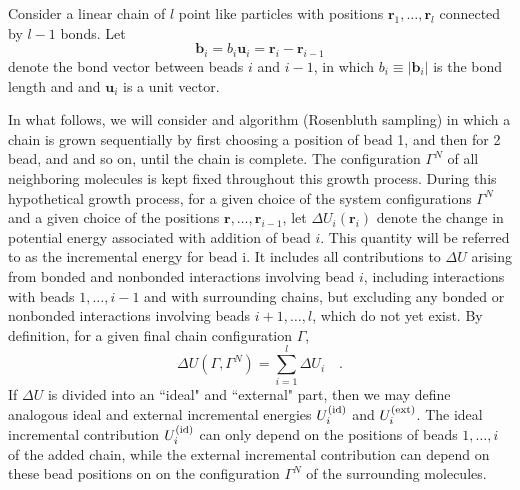 \documentclass[12pt]{article} %
\newcommand{\vv}[1]{\mathbf{#1}}
\newcommand\system{\Gamma^{N}}
\newcommand\chain{\Gamma}
\newcommand\delU{\Delta U}
\newcommand\Uid{U^{({\rm id})}}
\newcommand\Uext{U^{({\rm ext})}}
\newcommand\vbead{\vv{r}}
\newcommand\nbead{l}
\newcommand\vbond{\vv{b}}
\newcommand\ubond{\vv{u}}
\newcommand\rbond{b}
\newcommand\nbond{l-1}
\begin{document}
Consider a linear chain of $\nbead$ point like particles with positions 
$\vbead_{1},\ldots,\vbead_{\nbead}$ connected by $\nbond$ bonds. Let 
\begin{equation}
   \vbond_{i} = \rbond_{i} \ubond_{i} = \vbead_{i} - \vbead_{i-1}
\end{equation}
denote the bond vector between beads $i$ and $i-1$, in which 
$\rbond_{i} \equiv |\vbond_{i}|$ is the bond length and and $\ubond_{i}$ is a unit 
vector.  

In what follows, we will consider and algorithm (Rosenbluth sampling) in which a chain is grown sequentially by first choosing a position of bead 1, and then for 2 bead, and and so on, until the chain is complete.  The configuration $\system$ of all neighboring molecules is kept fixed throughout this growth process. During this hypothetical growth process, for a given choice of the system configurations $\system$ and a given choice of the positions $\vbead, \ldots, \vbead_{i-1}$, let $\delU_{i}(\vbead_{i})$ denote the change in potential energy associated with addition of bead $i$.  This quantity will be referred to as the incremental energy for bead i. It includes all contributions to $\delU$ arising from bonded and nonbonded interactions involving bead $i$, including interactions with beads $1,\ldots, i-1$ and with surrounding chains, but excluding any bonded or nonbonded interactions involving beads $i+1,\ldots,\nbead$, which do not yet exist. By definition, for a given final chain configuration $\chain$,
\begin{equation}
   \delU(\chain, \system) = \sum_{i=1}^{\nbead} \delU_{i} \quad.
\end{equation}
If $\delU$ is divided into an ``ideal" and ``external" part, then we may define analogous ideal and external incremental energies $\Uid_{i}$ and $\Uext_{i}$. The ideal incremental contribution $\Uid_{i}$ can only depend on the positions of beads $1,\ldots,i$ of the added chain, while the external incremental contribution can depend on these bead positions on on the configuration $\system$ of the surrounding molecules.
\end{document}
